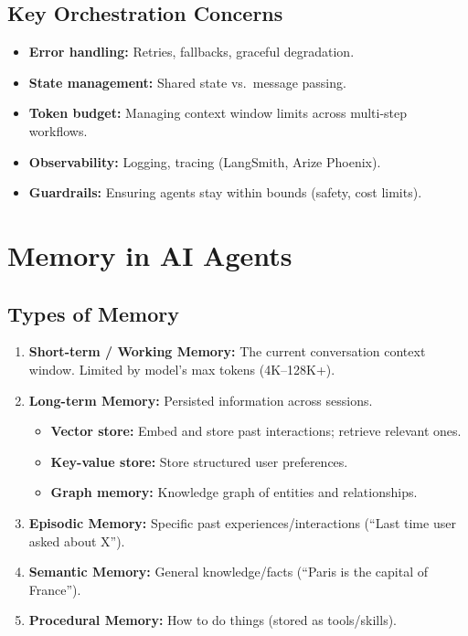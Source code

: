 \documentclass[11pt,a4paper]{article}
\begin{document}
\subsection{Key Orchestration Concerns}
\begin{itemize}[nosep]
  \item \textbf{Error handling:} Retries, fallbacks, graceful degradation.
  \item \textbf{State management:} Shared state vs.\ message passing.
  \item \textbf{Token budget:} Managing context window limits across multi-step workflows.
  \item \textbf{Observability:} Logging, tracing (LangSmith, Arize Phoenix).
  \item \textbf{Guardrails:} Ensuring agents stay within bounds (safety, cost limits).
\end{itemize}

\section{Memory in AI Agents}

\subsection{Types of Memory}
\begin{enumerate}[nosep]
  \item \textbf{Short-term / Working Memory:} The current conversation context window. Limited by model's max tokens (4K--128K+).
  \item \textbf{Long-term Memory:} Persisted information across sessions.
    \begin{itemize}[nosep]
      \item \textbf{Vector store:} Embed and store past interactions; retrieve relevant ones.
      \item \textbf{Key-value store:} Store structured user preferences.
      \item \textbf{Graph memory:} Knowledge graph of entities and relationships.
    \end{itemize}
  \item \textbf{Episodic Memory:} Specific past experiences/interactions (``Last time user asked about X'').
  \item \textbf{Semantic Memory:} General knowledge/facts (``Paris is the capital of France'').
  \item \textbf{Procedural Memory:} How to do things (stored as tools/skills).
\end{enumerate}
\end{document}
